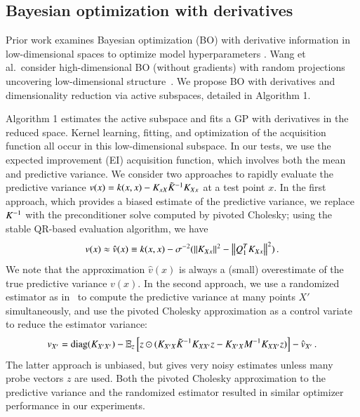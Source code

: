 \subsection{Bayesian optimization with derivatives}

Prior work examines Bayesian optimization (BO) with derivative information in
low-dimensional spaces to optimize model hyperparameters \citep{wu2017bayesian}.
Wang et al.~consider high-dimensional BO (without gradients) with random
projections uncovering low-dimensional structure~\citep{wang2013bayesian}. We
propose BO with derivatives and dimensionality reduction via active subspaces,
detailed in Algorithm 1.


Algorithm 1 estimates the active subspace and fits a GP with derivatives in the
reduced space.  Kernel learning, fitting, and optimization of the acquisition
function all occur in this low-dimensional subspace.  In our tests, we use the
expected improvement (EI) acquisition function, which involves both the mean and
predictive variance.  We consider two approaches to rapidly evaluate the
predictive variance $v(x) = k(x,x)-K_{xX} \tilde{K}_{}^{-1} K_{Xx}$ at a test point
$x$.  In the first approach, which provides a biased estimate of the predictive
variance, we replace $K_{}^{-1}$ with the preconditioner solve computed by
pivoted Cholesky; using the stable QR-based evaluation algorithm, we have
\begin{equation}\label{eqn:qrpred}
  v(x) \approx \hat{v}(x) \equiv k(x,x) - \sigma^{-2} (\left\lVert K_{Xx}\right\rVert^2-\left\lVert Q_1^T K_{Xx}\right\rVert^2)\,.
\end{equation}
We note that the approximation $\hat{v}(x)$ is always a (small) overestimate of
the true predictive variance $v(x)$. In the second approach, we use a randomized
estimator as in~\cite{Bekas:2007:EDM} to compute the predictive variance at many
points $X'$ simultaneously, and use the pivoted Cholesky approximation as a
control variate to reduce the estimator variance:
\begin{equation}\label{eqn:predcv}
  v_{X'} = \operatorname{diag}(K_{X'X'}) - \operatorname{\mathbb{E}}_z\left[z \odot (K_{X'X} \tilde{K}_{}^{-1} K_{XX'}z
  - K_{X'X} M^{-1} K_{XX'} z)\right] -\hat{v}_{X'}\,.
\end{equation}
The latter approach is unbiased, but gives very noisy estimates unless many
probe vectors $z$ are used.  Both the pivoted Cholesky approximation to the
predictive variance and the randomized estimator resulted in similar optimizer
performance in our experiments.
 
